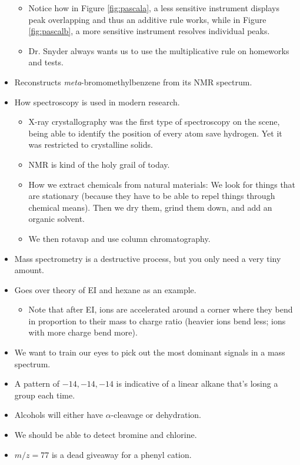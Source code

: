 \documentclass[../notes.tex]{subfiles}
\begin{document}
\begin{itemize}
\begin{itemize}
        \item Notice how in Figure \ref{fig:pascala}, a less sensitive instrument displays peak overlapping and thus an additive rule works, while in Figure \ref{fig:pascalb}, a more sensitive instrument resolves individual peaks.
        \item Dr. Snyder always wants us to use the multiplicative rule on homeworks and tests.
    \end{itemize}
    \item Reconstructs \emph{meta}-bromomethylbenzene from its NMR spectrum.
    \item How spectroscopy is used in modern research.
    \begin{itemize}
        \item X-ray crystallography was the first type of spectroscopy on the scene, being able to identify the position of every atom save hydrogen. Yet it was restricted to crystalline solids.
        \item NMR is kind of the holy grail of today.
        \item How we extract chemicals from natural materials: We look for things that are stationary (because they have to be able to repel things through chemical means). Then we dry them, grind them down, and add an organic solvent.
        \item We then rotavap and use column chromatography.
    \end{itemize}
    \item Mass spectrometry is a destructive process, but you only need a very tiny amount.
    \item Goes over theory of EI and hexane as an example.
    \begin{itemize}
        \item Note that after EI, ions are accelerated around a corner where they bend in proportion to their mass to charge ratio (heavier ions bend less; ions with more charge bend more).
    \end{itemize}
    \item We want to train our eyes to pick out the most dominant signals in a mass spectrum.
    \item A pattern of $-14,-14,-14$ is indicative of a linear alkane that's losing a  group each time.
    \item Alcohols will either have $\alpha$-cleavage or dehydration.
    \item We should be able to detect bromine and chlorine.
    \item $m/z=77$ is a dead giveaway for a phenyl cation.

\end{itemize}
\end{document}
